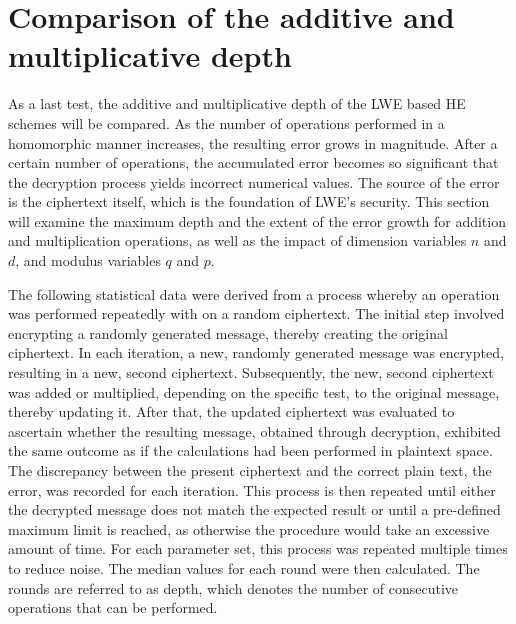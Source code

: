 \section{Comparison of the additive and multiplicative depth}

As a last test, the additive and multiplicative depth of the LWE based HE schemes will be compared. As the number of operations performed in a homomorphic manner increases, the resulting error grows in magnitude. After a certain number of operations, the accumulated error becomes so significant that the decryption process yields incorrect numerical values. The source of the error is the ciphertext itself, which is the foundation of LWE's security. This section will examine the maximum depth and the extent of the error growth for addition and multiplication operations, as well as the impact of dimension variables $n$ and $d$, and modulus variables $q$ and $p$.

The following statistical data were derived from a process whereby an operation was performed repeatedly with on a random ciphertext. The initial step involved encrypting a randomly generated message, thereby creating the original ciphertext. In each iteration, a new, randomly generated message was encrypted, resulting in a new, second ciphertext. Subsequently, the new, second  ciphertext was added or multiplied, depending on the specific test, to the original message, thereby updating it. After that, the updated ciphertext was evaluated to ascertain whether the resulting message, obtained through decryption, exhibited the same outcome as if the calculations had been performed in plaintext space. The discrepancy between the present ciphertext and the correct plain text, the error, was recorded for each iteration.
This process is then repeated until either the decrypted message does not match the expected result or until a pre-defined maximum limit is reached, as otherwise the procedure would take an excessive amount of time. For each parameter set, this process was repeated multiple times to reduce noise. The median values for each round were then calculated. The rounds are referred to as depth, which denotes the number of consecutive operations that can be performed.

